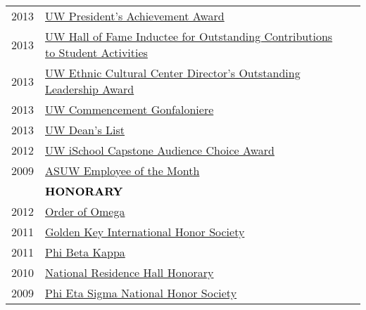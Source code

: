 \documentclass[11pt]{article}
\begin{document}
{{\begin{longtable}{Rp{0.75in}p{5.0in}}
\footnotesize{2013} & \href{https://www.washington.edu/omad/celebration/recognition-scholarship-recipients/2013-celebration-scholarship-recipients/}{{UW President's Achievement Award}}\\

\footnotesize{2013} & \href{https://depts.washington.edu/thehub/hub-events/hub-awards/}{{UW Hall of Fame Inductee for Outstanding Contributions to Student Activities}}\\

\footnotesize{2013} & \href{https://www.facebook.com/EthnicCulturalCenter/photos/a.10151638127531422.1073741830.124987626421/10151638128881422/}{{UW Ethnic Cultural Center Director's Outstanding Leadership Award}}\\

\footnotesize{2013} & \href{https://www.facebook.com/UWiSchool/posts/10151645734368695}{{UW Commencement Gonfaloniere}}\\

\footnotesize{2013} & \href{https://www.yakimaherald.com/news/education/school-news-sept/article_af5885a3-bcbc-5925-bb87-a84844c6d36a.html}{{UW Dean's List}}\\

\footnotesize{2012} & \href{https://ischool.uw.edu/capstone/projects/awards}{{UW iSchool Capstone Audience Choice Award}}\\

\footnotesize{2009} & \href{https://web.archive.org/web/20200328032852/https://wiki.asuw.org/index.php/Bryan_Dosono}{{ASUW Employee of the Month}}\\

& \textcolor{black}{\uppercase{\textbf{Honorary}}}\\

\footnotesize{2012} & \href{http://orderofomega.org/}{{Order of Omega}}\\

\footnotesize{2011} & \href{https://www.goldenkey.org/}{{Golden Key International Honor Society}}\\

\footnotesize{2011} & \href{https://www.pbk.org/}{{Phi Beta Kappa}}\\

\footnotesize{2010} & \href{http://students.washington.edu/nrhh/Relevant/Active\%20Members.html}{{National Residence Hall Honorary}}\\

\footnotesize{2009} & \href{https://www.phietasigma.org/}{{Phi Eta Sigma National Honor Society}}\\


\end{longtable}}}
\end{document}
